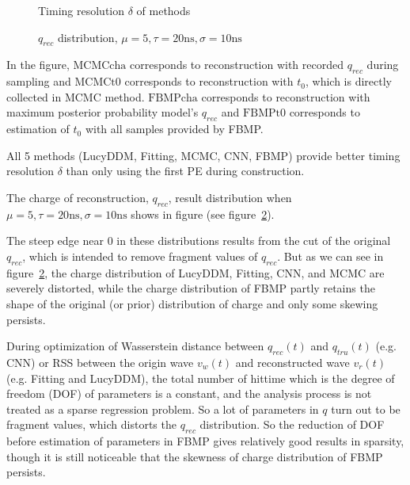 \begin{figure}[H]
    \centering
    \resizebox{\textwidth}{!}{}
    \caption{\label{fig:deltamethods} Timing resolution $\delta$ of methods}
\end{figure}

\begin{figure}[H]
    \centering
    \resizebox{\textwidth}{!}{}
    \caption{\label{fig:recchargehist}  $q_{rec}$ distribution, $\mu=5, \tau=20\mathrm{ns}, \sigma=10\mathrm{ns}$}
\end{figure}

In the figure, $\mathrm{MCMCcha}$ corresponds to reconstruction with recorded $q_{rec}$ during sampling and $\mathrm{MCMCt0}$ corresponds to reconstruction with $t_{0}$, which is directly collected in MCMC method. $\mathrm{FBMPcha}$ corresponds to reconstruction with maximum posterior probability model's $q_{rec}$ and $\mathrm{FBMPt0}$ corresponds to estimation of $t_{0}$ with all samples provided by FBMP. 

All 5 methods (LucyDDM, Fitting, MCMC, CNN, FBMP) provide better timing resolution $\delta$ than only using the first PE during construction. 


The charge of reconstruction, $q_{rec}$, result distribution when $\mu=5, \tau=20\mathrm{ns}, \sigma=10\mathrm{ns}$ shows in figure (see figure~\ref{fig:recchargehist}). 

The steep edge near 0 in these distributions results from the cut of the original $q_{rec}$, which is intended to remove fragment values of $q_{rec}$. But as we can see in figure~\ref{fig:recchargehist}, the charge distribution of LucyDDM, Fitting, CNN, and MCMC are severely distorted, while the charge distribution of FBMP partly retains the shape of the original (or prior) distribution of charge and only some skewing persists. 

During optimization of Wasserstein distance between $q_{rec}(t)$ and $q_{tru}(t)$ (e.g. CNN) or RSS between the origin wave $v_{w}(t)$ and reconstructed wave $v_{r}(t)$ (e.g. Fitting and LucyDDM), the total number of hittime which is the degree of freedom (DOF) of parameters is a constant, and the analysis process is not treated as a sparse regression problem. So a lot of parameters in $q$ turn out to be fragment values, which distorts the $q_{rec}$ distribution. So the reduction of DOF before estimation of parameters in FBMP gives relatively good results in sparsity, though it is still noticeable that the skewness of charge distribution of FBMP persists. 


